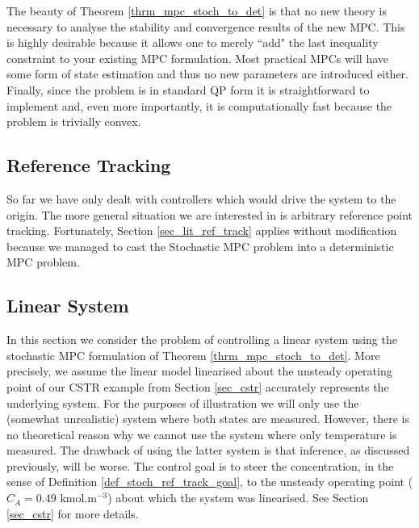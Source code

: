 The beauty of Theorem \ref{thrm_mpc_stoch_to_det} is that no new theory is necessary to analyse the stability and convergence results of the new MPC. This is highly desirable because it allows one to merely ``add" the last inequality constraint to your existing MPC formulation. Most practical MPCs will have some form of state estimation and thus no new parameters are introduced either. Finally, since the problem is in standard QP form it is straightforward to implement and, even more importantly, it is computationally fast because the problem is trivially convex. 
\subsection{Reference Tracking}
So far we have only dealt with controllers which would drive the system to the origin. The more general situation we are interested in is arbitrary reference point tracking. Fortunately, Section \ref{sec_lit_ref_track} applies without modification because we managed to cast the Stochastic MPC problem into a deterministic MPC problem. 

\subsection{Linear System}
\label{sec_lin_sys_cont}
In this section we consider the problem of controlling a linear system using the stochastic MPC formulation of Theorem \ref{thrm_mpc_stoch_to_det}. More precisely, we assume the linear model linearised about the unsteady operating point of our CSTR example from Section \ref{sec_cstr} accurately represents the underlying system. For the purposes of illustration we will only use the (somewhat unrealistic) system where both states are measured. However, there is no theoretical reason why we cannot use the system where only temperature is measured. The drawback of using the latter system is that inference, as discussed previously, will be worse. The control goal is to steer the concentration, in the sense of Definition \ref{def_stoch_ref_track_goal}, to the unsteady operating point ($C_A = 0.49$ kmol.m$^{-3}$) about which the system was linearised. See Section \ref{sec_cstr} for more details.

